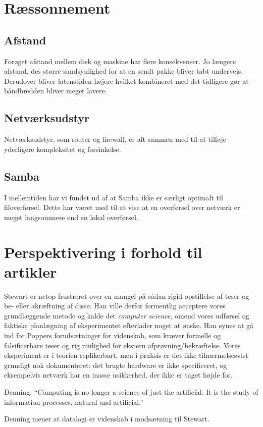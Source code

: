 \documentclass{article}
\begin{document}
\section{Ræssonnement}

\subsection{Afstand}
Forøget afstand mellem disk og maskine har flere konsekvenser. Jo længere afstand, des større sandsynlighed for at en sendt pakke bliver tabt undervejs. Derudover bliver latenstiden højere hvilket kombineret med det tidligere gør at båndbredden bliver meget lavere.

\subsection{Netværksudstyr}
Netværksudstyr, som router og firewall, er alt sammen med til at tilføje yderligere kompleksitet og forsinkelse.

\subsection{Samba}
I mellemtiden har vi fundet ud af at Samba ikke er særligt optimalt til filoverførsel. Dette har været med til at vise at en overførsel over netværk er meget langsommere end en lokal overførsel.

\section{Perspektivering i forhold til artikler}

Stewart er netop frustreret over en mangel på sådan rigid opstillelse af teser og be- eller akræftning af disse. Han ville derfor formentlig acceptere vores grundlæggende metode og kalde det \textit{computer science}, omend vores udførsel og faktiske planlægning af eksperimentet efterlader noget at ønske. Han synes at gå ind for Poppers forudsætninger for videnskab, som kræver formelle og falsificerbare teser og rig mulighed for ekstern afprøvning/bekræftelse. Vores eksperiment er i teorien replikerbart, men i praksis er det ikke tilnærmelsesvist grundigt nok dokumenteret: det brugte hardware er ikke specificeret, og eksempelvis netværk har en masse usikkerhed, der ikke er taget højde for.   

Denning: ``Computing is no longer a science of just the artificial. It is the study of information processes, natural and artificial.''

Denning mener at datalogi er videnskab i modsætning til Stewart.
\end{document}
